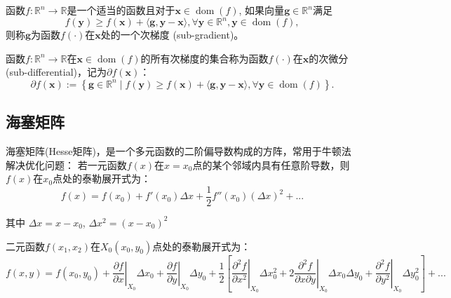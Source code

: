 \begin{definition}[次梯度]
    函数$f: \mathbb{R}^{n} \rightarrow \mathbb{R}$是一个适当的函数且对于$\bm{x} \in \operatorname{dom}(f)$, 如果向量$\bm{g} \in \mathbb{R}^{n}$满足
    \begin{equation}
        f(\bm{y}) \geq f(\bm{x})+\langle\bm{g}, \bm{y}-\bm{x}\rangle, \forall \bm{y} \in \mathbb{R}^{n}, \bm{y} \in \operatorname{dom}(f) ,
        \nonumber
    \end{equation}
    则称$\bm{g}$为函数$f(\cdot)$在$\bm{x}$处的一个次梯度 (sub-gradient)。
\end{definition}

\begin{definition}[次微分]
    函数$f: \mathbb{R}^{n} \rightarrow \mathbb{R}$在$\bm{x} \in \operatorname{dom}(f)$的所有次梯度的集合称为函数$f(\cdot)$在$\bm{x}$的次微分 (sub-differential)，记为$\partial f(\bm{x})$：
    \begin{equation}
        \partial f(\bm{x}):=\left\{\bm{g} \in \mathbb{R}^{n} \mid f(\bm{y}) \geq f(\bm{x})+\langle\bm{g}, \bm{y}-\bm{x}\rangle, \forall \bm{y} \in \operatorname{dom}(f)\right\} .
        \nonumber
    \end{equation}
\end{definition}



\subsection{海塞矩阵}
海塞矩阵(Hesse矩阵)，是一个多元函数的二阶偏导数构成的方阵，常用于牛顿法解决优化问题：
若一元函数$f(x)$在$x=x_0$点的某个邻域内具有任意阶导数，则$f(x)$在$x_0$点处的泰勒展开式为：
\begin{equation}
    f(x) = f(x_0) + f'(x_0)\Delta x + \frac{1}{2}f''(x_0)(\Delta x)^2 + ...
\end{equation}

其中 $\Delta x = x - x_0$, $\Delta x^2 = (x - x_0)^2$

二元函数$f(x_1,x_2)$在$X_0(x_0,y_0)$点处的泰勒展开式为：
\begin{equation}
    f(x,y) = f(x_0,y_0)
        + \left.\displaystyle\frac{\partial f}{\partial x}\right|_{X_0}\Delta x_0    
        + \left.\displaystyle\frac{\partial f}{\partial y}\right|_{X_0}\Delta y_0    
        + \frac{1}{2}
        \left[ \left.\displaystyle\frac{\partial^2f}{\partial x^2}\right|_{X_0}\Delta x_0^2 + 
          2\left.\displaystyle\frac{\partial^2f}{\partial x\partial y}\right|_{X_0}\Delta x_0\Delta y_0 + 
          \left.\displaystyle\frac{\partial^2f}{\partial y^2}\right|_{X_0}\Delta y_0^2 \right]   
        + ...
\end{equation}

